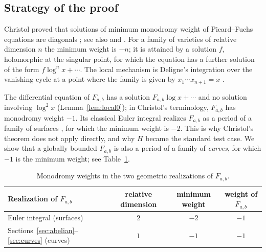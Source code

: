 \documentclass[11pt]{amsart}
\theoremstyle{definition}
\theoremstyle{remark}
\numberwithin{equation}{section}
\newcommand{\Fab}{F_{a,b}}
\begin{document}
\subsection{Strategy of the proof}
Christol proved that solutions of minimum monodromy weight of Picard--Fuchs equations are diagonals \citep[Theorem~12]{Christol1990}; see also \citet{Christol1985} and \citet[\S4.2, Corollary~30]{Christol2015}. For a family of varieties of relative dimension $n$ the minimum weight is $-n$; it is attained by a solution $f$, holomorphic at the singular point, for which the equation has a further solution of the form $f\log^nx+\cdots$. The local mechanism is Deligne's integration over the vanishing cycle at a point where the family is given by $x_1\cdots x_{n+1}=x$ \citep{Deligne1984}.

The differential equation of $\Fab$ has a solution $\Fab\log x+\cdots$ and no solution involving $\log^2x$ (Lemma~\ref{lem:local0}); in Christol's terminology, $\Fab$ has monodromy weight $-1$. Its classical Euler integral realizes $\Fab$ as a period of a family of surfaces \citep[\S4.3]{Christol2015}, for which the minimum weight is $-2$. This is why Christol's theorem does not apply directly, and why $H$ became the standard test case. We show that a globally bounded $\Fab$ is also a period of a family of \emph{curves}, for which $-1$ is the minimum weight; see Table~\ref{tab:weights}.

\begin{table}[ht]
\centering
\begin{tabular}{lccc}
\toprule
Realization of $\Fab$ & relative dimension & minimum weight & weight of $\Fab$\\
\midrule
Euler integral (surfaces) & $2$ & $-2$ & $-1$\\
Sections~\ref{sec:abelian}--\ref{sec:curves} (curves) & $1$ & $-1$ & $-1$\\
\bottomrule
\end{tabular}
\medskip
\caption{Monodromy weights in the two geometric realizations of $\Fab$.}\label{tab:weights}
\end{table}
\end{document}

